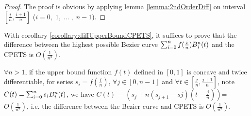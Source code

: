 \begin{proof}
The proof is obvious by applying lemma \ref{lemma:2ndOrderDiff} on interval $\left[\frac{i}{n}, \frac{i+1}{n}\right]$ ($i=0,\;1,\;...\;,\;n-1$).
\end{proof}

With corollary \ref{corollary:diffUpperBoundCPETS}, it suffices to prove that the difference between the highest possible Bezier curve $\sum_{i=0}^{n}f(\frac{i}{n})B\textsupsub{$n$}{$i$}(t)$ and the CPETS is $O(\frac{1}{n^{2}})$.

\begin{lemma}
$\forall n > 1$, if the upper bound function $f(t)$ defined in $\left[0,1\right]$ is concave and twice differentiable, for series $s_{i}=f(\frac{i}{n})$, $\forall j \in \left[0, n-1\right]$ and 
$\forall t \in \left[\frac{j}{n}, \frac{j+1}{n}\right]$, note $C(t)=\sum_{i=0}^{n}s_{i}B\textsupsub{$n$}{$i$}(t)$, we have $C(t)$ $-$ $(s_{j}+n(s_{j+1}-s{j})(t-\frac{j}{n}))$=$O(\frac{1}{n^{2}})$, i.e. the difference between the Bezier curve and CPETS is $O(\frac{1}{n^{2}})$.
\label{lemma:mainLemmaDiff}
\end{lemma}


